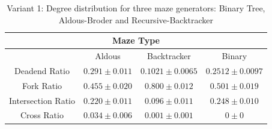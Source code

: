 \begin{table}[!h]
    \begin{center} 
        \caption{Variant 1: Degree distribution for three maze generators: Binary Tree, Aldous-Broder and Recursive-Backtracker} 
    \begin{tabular}{ c c c c} 
    \multicolumn{5}{c}{Maze Type} \\
    \hline
    &Aldous&Backtracker&Binary\\
    \hline
Deadend Ratio&$0.291\pm 0.011$&$0.1021\pm 0.0065$&$0.2512\pm 0.0097$\\    
    \hline
Fork Ratio&$0.455\pm 0.020$&$0.800\pm 0.012$&$0.501\pm 0.019$\\
    \hline
Intersection Ratio&$0.220\pm 0.011$&$0.096\pm 0.011$&$0.248\pm 0.010$\\    
    \hline
Cross Ratio&$0.034\pm 0.006$&$0.001\pm 0.001$&$0\pm 0$\\    
    \hline   
     \end{tabular} 
    \end{center}
     \end{table}

